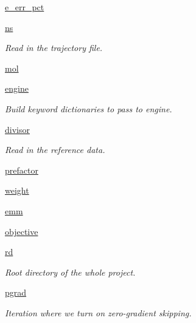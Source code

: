 \begin{DoxyCompactItemize}
\item 
\hyperlink{classforcebalance_1_1interaction_1_1Interaction_ae66b1b95cac5307950ae787b5409200b}{e\-\_\-err\-\_\-pct}
\item 
\hyperlink{classforcebalance_1_1interaction_1_1Interaction_af8eea2643c465ee51732bff35b4b9bc8}{ns}
\begin{DoxyCompactList}\small\item\em Read in the trajectory file. \end{DoxyCompactList}\item 
\hyperlink{classforcebalance_1_1interaction_1_1Interaction_ae701905246f4c2f5af7cfa1a7d053002}{mol}
\item 
\hyperlink{classforcebalance_1_1interaction_1_1Interaction_ae4c7f1d811ba889282620acbaa4c5f2a}{engine}
\begin{DoxyCompactList}\small\item\em Build keyword dictionaries to pass to engine. \end{DoxyCompactList}\item 
\hyperlink{classforcebalance_1_1interaction_1_1Interaction_a57f25d35d31643d5467fd32579f64030}{divisor}
\begin{DoxyCompactList}\small\item\em Read in the reference data. \end{DoxyCompactList}\item 
\hyperlink{classforcebalance_1_1interaction_1_1Interaction_ad4e78437713a0b9b809e4ba52cbbf9d2}{prefactor}
\item 
\hyperlink{classforcebalance_1_1interaction_1_1Interaction_a68a6e43e48ec75f375fb987e177126a9}{weight}
\item 
\hyperlink{classforcebalance_1_1interaction_1_1Interaction_a2b97abefbf9d9f2b061b9da3b9d0bb30}{emm}
\item 
\hyperlink{classforcebalance_1_1interaction_1_1Interaction_ad25168cac2752545c55fc7e9206d9d29}{objective}
\item 
\hyperlink{classforcebalance_1_1target_1_1Target_a4edb69fbde792e9f2f27e54b7c978c8e}{rd}
\begin{DoxyCompactList}\small\item\em Root directory of the whole project. \end{DoxyCompactList}\item 
\hyperlink{classforcebalance_1_1target_1_1Target_a684235b4332b608c4e2da22982c2fdfa}{pgrad}
\begin{DoxyCompactList}\small\item\em Iteration where we turn on zero-\/gradient skipping. \end{DoxyCompactList}\item 

\end{DoxyCompactItemize}
